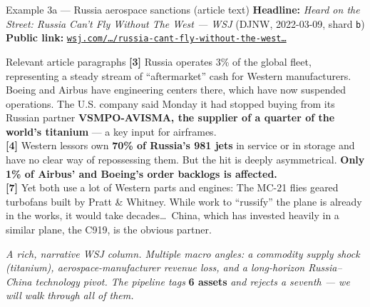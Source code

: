 \documentclass[10pt,aspectratio=169]{beamer}
\begin{document}
\begin{frame}[fragile]{Example 3a --- Russia aerospace sanctions (article text)}
  \scriptsize
  \textbf{Headline:} \emph{Heard on the Street: Russia Can't Fly Without The West --- WSJ}
  \hfill (DJNW, 2022-03-09, shard \texttt{b})\\
  \textbf{Public link:} \href{https://www.wsj.com/business/airlines/russia-cant-fly-without-the-westbut-may-eventually-propel-china-11646738302}{\texttt{wsj.com/\ldots/russia-cant-fly-without-the-west\ldots}}

  \vspace{0.4em}
  \begin{block}{Relevant article paragraphs}
    \scriptsize
    \textbf{[3]} Russia operates 3\% of the global fleet, representing a steady stream of
    ``aftermarket'' cash for Western manufacturers. Boeing and Airbus have engineering centers
    there, which have now suspended operations. The U.S. company said Monday it had stopped
    buying from its Russian partner \textbf{VSMPO-AVISMA, the supplier of a quarter of the
    world's titanium} --- a key input for airframes.\\[0.3em]
    \textbf{[4]} Western lessors own \textbf{70\% of Russia's 981 jets} in service or in storage
    and have no clear way of repossessing them. But the hit is deeply asymmetrical.
    \textbf{Only 1\% of Airbus' and Boeing's order backlogs is affected.}\\[0.3em]
    \textbf{[7]} Yet both use a lot of Western parts and engines: The MC-21 flies geared
    turbofans built by Pratt \& Whitney. While work to ``russify'' the plane is already in the
    works, it would take decades\ldots\ China, which has invested heavily in a similar plane,
    the C919, is the obvious partner.
  \end{block}

  \vspace{0.3em}
  \emph{A rich, narrative WSJ column. Multiple macro angles: a commodity supply shock (titanium),
  aerospace-manufacturer revenue loss, and a long-horizon Russia--China technology pivot. The
  pipeline tags} \textbf{6 assets} \emph{and rejects a seventh --- we will walk through all of
  them.}
\end{frame}
\end{document}
